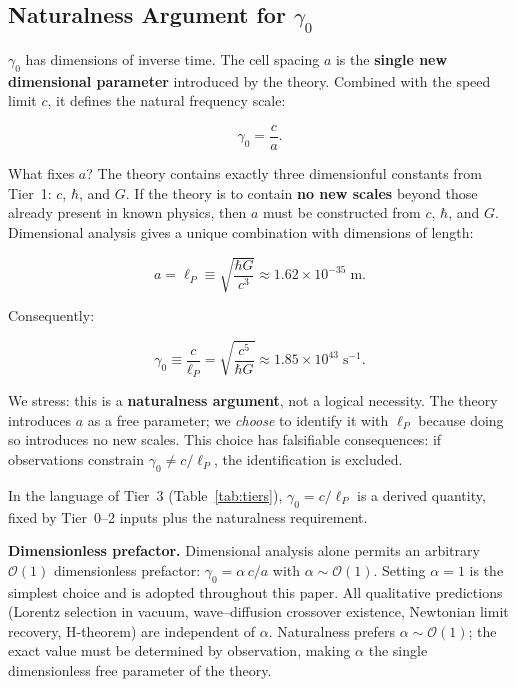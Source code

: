 \documentclass[aps,prd,twocolumn,showpacs,superscriptaddress,preprintnumbers]{revtex4-2}
\begin{document}
\subsection{Naturalness Argument for $\gamma_0$}
\label{sec:naturalness}

$\gamma_0$ has dimensions of inverse time.
The cell spacing $a$ is the \textbf{single new dimensional parameter} introduced by the theory.
Combined with the speed limit $c$, it defines the natural frequency scale:

\begin{equation}
\gamma_0 = \frac{c}{a}.
\label{eq:gamma0_form}
\end{equation}

What fixes $a$?
The theory contains exactly three dimensionful constants from Tier~1: $c$, $\hbar$, and $G$.
If the theory is to contain \textbf{no new scales} beyond those already present in known physics, then $a$ must be constructed from $c$, $\hbar$, and $G$.
Dimensional analysis gives a unique combination with dimensions of length:

\begin{equation}
a = \ell_P \equiv \sqrt{\frac{\hbar G}{c^3}} \approx 1.62 \times 10^{-35}\;\text{m}.
\label{eq:lp_def}
\end{equation}

Consequently:

\begin{equation}
\boxed{\gamma_0 \equiv \frac{c}{\ell_P} = \sqrt{\frac{c^5}{\hbar G}} \approx 1.85 \times 10^{43}\;\text{s}^{-1}}.
\label{eq:gamma0}
\end{equation}

We stress: this is a \textbf{naturalness argument}, not a logical necessity.
The theory introduces $a$ as a free parameter; we \emph{choose} to identify it with $\ell_P$ because doing so introduces no new scales.
This choice has falsifiable consequences: if observations constrain $\gamma_0 \neq c/\ell_P$, the identification is excluded.

In the language of Tier~3 (Table~\ref{tab:tiers}), $\gamma_0=c/\ell_P$ is a derived quantity, fixed by Tier~0--2 inputs plus the naturalness requirement.

\textbf{Dimensionless prefactor.}
Dimensional analysis alone permits an arbitrary $\mathcal{O}(1)$ dimensionless prefactor: $\gamma_0 = \alpha\,c/a$ with $\alpha\sim\mathcal{O}(1)$.
Setting $\alpha=1$ is the simplest choice and is adopted throughout this paper.
All qualitative predictions (Lorentz selection in vacuum, wave--diffusion crossover existence, Newtonian limit recovery, H-theorem) are independent of $\alpha$.
Naturalness prefers $\alpha\sim\mathcal{O}(1)$; the exact value must be determined by observation, making $\alpha$ the single dimensionless free parameter of the theory.
\end{document}
